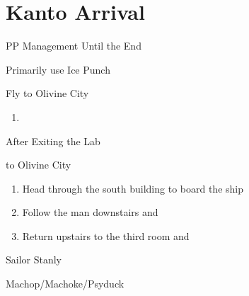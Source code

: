 \chapter{Kanto Arrival}
\vspace{0.5mm}

\begin{paracol}{2}
\switchcolumn
\begin{misc}{PP Management Until the End}
	\begin{notes}
		\item {}
		\item Primarily use Ice Punch
	\end{notes}
\end{misc}

\begin{story}{Fly to Olivine City}
	\varwb
	\varwe
\end{story}

\switchcolumn
\begin{enumerate}
	\item {}
\end{enumerate}

\begin{menu}{After Exiting the Lab}
	\varwb
	\begin{pokeMenu}
		\item {} \fly{} to Olivine City \menuHlTwo{(5\pointDown)}
	\end{pokeMenu}
	\varwe
\end{menu}

\begin{enumerate}[resume]
	\item Head through the south building to board the ship 
	\item Follow the man downstairs and 
	\item Return upstairs to the third room and 
\end{enumerate}

\begin{trainer}{Sailor Stanly}
	\varwb
	\begin{fightSection}{Machop/Machoke/Psyduck}
		\item {} \return{} 
	\end{fightSection}
	\varwe
\end{trainer}


\end{paracol}
